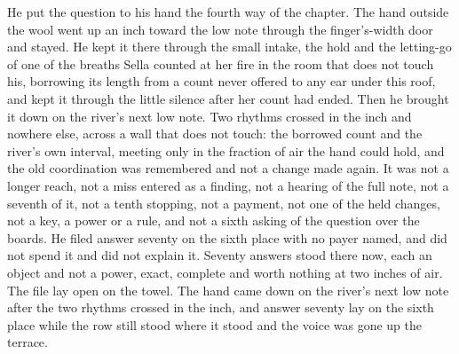 He put the question to his hand the fourth way of the chapter. The hand outside the wool went up an inch toward the low note through the finger's-width door and stayed. He kept it there through the small intake, the hold and the letting-go of one of the breaths Sella counted at her fire in the room that does not touch his, borrowing its length from a count never offered to any ear under this roof, and kept it through the little silence after her count had ended. Then he brought it down on the river's next low note. Two rhythms crossed in the inch and nowhere else, across a wall that does not touch: the borrowed count and the river's own interval, meeting only in the fraction of air the hand could hold, and the old coordination was remembered and not a change made again. It was not a longer reach, not a miss entered as a finding, not a hearing of the full note, not a seventh of it, not a tenth stopping, not a payment, not one of the held changes, not a key, a power or a rule, and not a sixth asking of the question over the boards. He filed answer seventy on the sixth place with no payer named, and did not spend it and did not explain it. Seventy answers stood there now, each an object and not a power, exact, complete and worth nothing at two inches of air. The file lay open on the towel. The hand came down on the river's next low note after the two rhythms crossed in the inch, and answer seventy lay on the sixth place while the row still stood where it stood and the voice was gone up the terrace.
